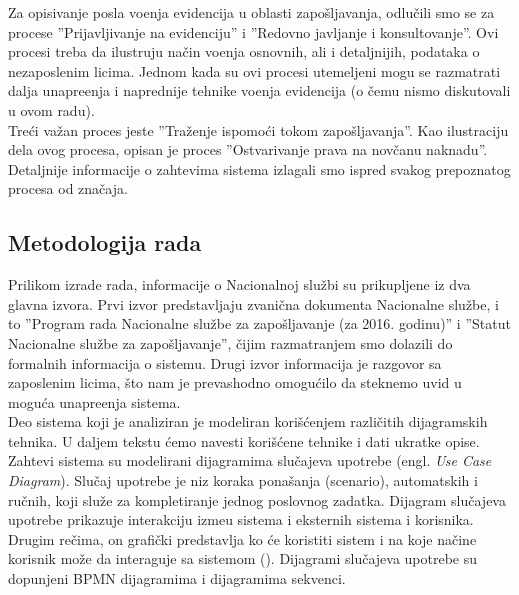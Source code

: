 Za opisivanje posla vo\dj enja evidencija u oblasti zapo\v sljavanja, odlu\v cili smo se za procese ''Prijavljivanje na evidenciju'' i ''Redovno javljanje i konsultovanje''. Ovi procesi treba da ilustruju na\v cin vo\dj enja osnovnih, ali i detaljnijih, podataka o nezaposlenim licima. Jednom kada su ovi procesi utemeljeni mogu se razmatrati dalja unapre\dj enja i naprednije tehnike vo\dj enja evidencija (o \v cemu nismo diskutovali u ovom radu).\\

Tre\'ci va\v zan proces jeste ''Tra\v zenje ispomo\' ci tokom zapo\v sljavanja''. Kao ilustraciju dela ovog procesa, opisan je proces ''Ostvarivanje prava na nov\v canu naknadu''.\\

Detaljnije informacije o zahtevima sistema izlagali smo ispred svakog prepoznatog procesa od zna\v caja.

\subsection{Metodologija rada}

Prilikom izrade rada, informacije o Nacionalnoj slu\v zbi su prikupljene iz dva glavna izvora. Prvi izvor predstavljaju zvani\v cna dokumenta Nacionalne slu\v zbe, i to ''Program rada Nacionalne slu\v zbe za zapo\v sljavanje (za 2016. godinu)'' i ''Statut Nacionalne slu\v zbe za zapo\v sljavanje'', \v cijim razmatranjem smo dolazili do formalnih informacija o sistemu. Drugi izvor informacija je razgovor sa zaposlenim licima, \v sto nam je prevashodno omogu\' cilo da steknemo uvid u mogu\' ca unapre\dj enja sistema.\\

Deo sistema koji je analiziran je modeliran kori\v s\' cenjem razli\v citih dijagramskih tehnika. U daljem tekstu \'cemo navesti kori\v s\'cene tehnike i dati ukratke opise.\\

Zahtevi sistema su modelirani dijagramima slu\v cajeva upotrebe (engl. \textit{Use Case Diagram}). Slu\v caj upotrebe je niz koraka pona\v sanja (scenario), automatskih i ru\v cnih, koji slu\v ze za kompletiranje jednog poslovnog zadatka. Dijagram slu\v cajeva upotrebe prikazuje interakciju izme\dj u sistema i eksternih sistema i korisnika. Drugim re\v cima, on grafi\v cki predstavlja ko \' ce koristiti sistem i na koje na\v cine korisnik mo\v ze da interaguje sa sistemom (\cite{SADM}). Dijagrami slu\v cajeva upotrebe su dopunjeni BPMN dijagramima i dijagramima sekvenci.\\

